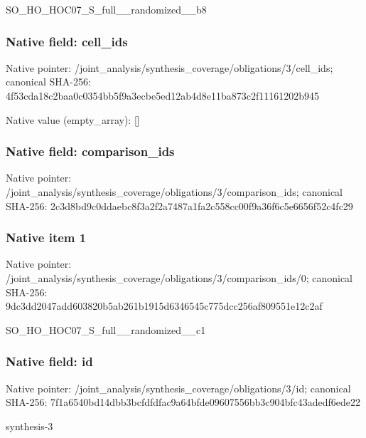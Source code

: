 \documentclass[10pt,a4paper]{article}
\begin{document}
\begingroup\raggedright\sloppy SO\_\allowbreak{}HO\_\allowbreak{}HOC07\_\allowbreak{}S\_\allowbreak{}full\_\allowbreak{}\_\allowbreak{}randomized\_\allowbreak{}\_\allowbreak{}b8\par\endgroup

\subsubsection{Native field: cell\_\allowbreak{}ids}
Native pointer: /joint\_\allowbreak{}analysis/synthesis\_\allowbreak{}coverage/obligations/3/cell\_\allowbreak{}ids; canonical SHA-256: 4f53cda18c2baa0c0354bb5f9a3ecbe5ed12ab4d8e11ba873c2f11161202b945

Native value (empty\_\allowbreak{}array): []

\subsubsection{Native field: comparison\_\allowbreak{}ids}
Native pointer: /joint\_\allowbreak{}analysis/synthesis\_\allowbreak{}coverage/obligations/3/comparison\_\allowbreak{}ids; canonical SHA-256: 2c3d8bd9c0ddaebc8f3a2f2a7487a1fa2c558cc00f9a36f6c5e6656f52c4fc29

\subsubsection{Native item 1}
Native pointer: /joint\_\allowbreak{}analysis/synthesis\_\allowbreak{}coverage/obligations/3/comparison\_\allowbreak{}ids/0; canonical SHA-256: 9dc3dd2047add603820b5ab261b1915d6346545c775dcc256af809551e12c2af

\begingroup\raggedright\sloppy SO\_\allowbreak{}HO\_\allowbreak{}HOC07\_\allowbreak{}S\_\allowbreak{}full\_\allowbreak{}\_\allowbreak{}randomized\_\allowbreak{}\_\allowbreak{}c1\par\endgroup

\subsubsection{Native field: id}
Native pointer: /joint\_\allowbreak{}analysis/synthesis\_\allowbreak{}coverage/obligations/3/id; canonical SHA-256: 7f1a6540bd14dbb3bcfdfdfac9a64bfde09607556bb3c904bfc43adedf6ede22

\begingroup\raggedright\sloppy synthesis-3\par\endgroup
\end{document}
